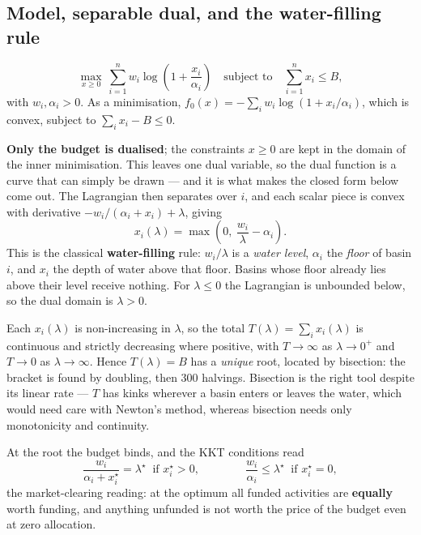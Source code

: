 \documentclass[11pt,a4paper]{article}
\theoremstyle{definition}
\newcommand{\lamstar}{\lambda^{\star}}
\begin{document}
\subsection{Model, separable dual, and the water-filling rule}

\begin{equation}\label{eq:alloc}
\max_{x\ge 0}\ \sum_{i=1}^{n}w_{i}\log\!\left(1+\frac{x_{i}}{\alpha_{i}}\right)
\quad\text{subject to}\quad \sum_{i=1}^{n}x_{i}\le B,
\end{equation}
with $w_{i},\alpha_{i}>0$. As a minimisation,
$f_{0}(x)=-\sum_{i}w_{i}\log(1+x_{i}/\alpha_{i})$, which is convex, subject to
$\sum_{i}x_{i}-B\le 0$.

\textbf{Only the budget is dualised}; the constraints $x\ge 0$ are kept in the domain of the
inner minimisation. This leaves one dual variable, so the dual function is a curve that can
simply be drawn --- and it is what makes the closed form below come out. The Lagrangian then
separates over $i$, and each scalar piece is convex with derivative
$-w_{i}/(\alpha_{i}+x_{i})+\lambda$, giving
\begin{equation}\label{eq:waterfill}
x_{i}(\lambda)=\max\!\left(0,\ \frac{w_{i}}{\lambda}-\alpha_{i}\right).
\end{equation}
This is the classical \textbf{water-filling} rule: $w_{i}/\lambda$ is a \emph{water level},
$\alpha_{i}$ the \emph{floor} of basin $i$, and $x_{i}$ the depth of water above that floor.
Basins whose floor already lies above their level receive nothing. For $\lambda\le 0$ the
Lagrangian is unbounded below, so the dual domain is $\lambda>0$.

Each $x_{i}(\lambda)$ is non-increasing in $\lambda$, so the total
$T(\lambda)=\sum_{i}x_{i}(\lambda)$ is continuous and strictly decreasing where positive, with
$T\to\infty$ as $\lambda\to 0^{+}$ and $T\to 0$ as $\lambda\to\infty$. Hence $T(\lambda)=B$ has a
\emph{unique} root, located by bisection: the bracket is found by doubling, then 300 halvings.
Bisection is the right tool despite its linear rate --- $T$ has kinks wherever a basin enters or
leaves the water, which would need care with Newton's method, whereas bisection needs only
monotonicity and continuity.

At the root the budget binds, and the KKT conditions read
\begin{equation}\label{eq:market}
\frac{w_{i}}{\alpha_{i}+x_{i}^{\star}}=\lamstar \ \text{ if } x_{i}^{\star}>0,
\qquad\qquad
\frac{w_{i}}{\alpha_{i}}\le\lamstar \ \text{ if } x_{i}^{\star}=0,
\end{equation}
the market-clearing reading: at the optimum all funded activities are \textbf{equally} worth
funding, and anything unfunded is not worth the price of the budget even at zero allocation.
\end{document}

